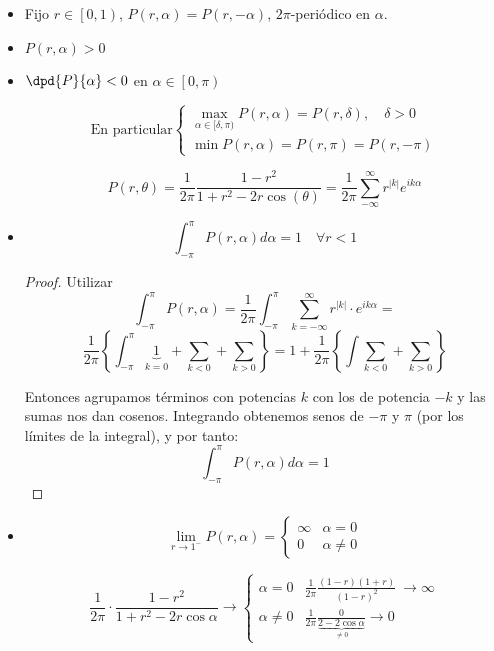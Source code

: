 		\begin{prop}
		$ $ %

		\begin{itemize}

			\item Fijo $r \in \left[ 0,1 \right)$, $P(r,\alpha) = P(r,-\alpha)$, $2\pi$-periódico en $\alpha$.

			\item $P(r,\alpha) > 0$

			\item $\dpd{P}{\alpha} < 0$ en $\alpha \in \left[ 0,\pi \right)$

			\[ \text{En particular} \begin{cases}
				\max\limits_{\alpha \in [\delta, \pi)} P(r,\alpha) = P(r,\delta), \quad \delta>0\\
				\min P(r,\alpha) = P(r,\pi) = P(r,-\pi)
			\end{cases} \]

			\obs \[ P(r, \theta) = \frac{1}{2\pi}\frac{1-r^2}{1+r^2-2r \cos(\theta)} = \frac{1}{2\pi} \sum_{-\infty}^\infty r^{|k|} e^{i k \alpha} \]

			\item \[
				\int_{-\pi}^\pi P(r, \alpha) d\alpha = 1 \quad \forall r < 1
			\]

			\begin{proof}
				Utilizar \[ \int_{-\pi}^\pi P(r, \alpha) = \frac{1}{2\pi} \int_{-\pi}^\pi \sum_{k=-\infty}^{\infty} r^{|k|} \cdot e^{ik\alpha}  = \]
				\[ \frac{1}{2\pi} \left\{ \int_{-\pi}^{\pi} \underbrace{1}_{k=0}  + \sum_{k<0} + \sum_{k>0} \right\} = 1 + \frac{1}{2\pi} \left\{ \int \sum_{k<0} + \sum_{k>0} \right\} \]

				Entonces agrupamos términos con potencias $k$ con los de potencia $-k$ y las sumas nos dan cosenos. Integrando obtenemos senos de $-\pi$ y $\pi$ (por los límites de la integral), y por tanto:
				\[\int_{-\pi}^{\pi} P(r, \alpha) d\alpha = 1\]
			\end{proof}


			\item \[
			\lim_{r \to 1^-} P(r, \alpha) = \begin{cases}
				\infty & \alpha = 0 \\
				0 & \alpha \neq 0
			\end{cases}
			\]

			\[
				\frac{1}{2\pi} \cdot \frac{1-r^2}{1+r^2-2r\cos \alpha} \rightarrow \begin{cases}
				\alpha = 0 & \frac{1}{2\pi} \frac{(1-r)(1+r)}{(1-r)^2} \ \rightarrow \infty \\
				\alpha \neq 0  & \frac{1}{2\pi} \frac{0}{\underbrace{2-2\cos \alpha}_{\neq 0}} \rightarrow 0
				\end{cases}
			\]


\end{itemize}
\end{prop}

